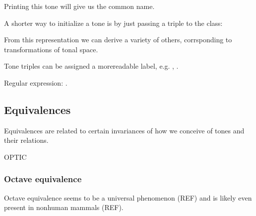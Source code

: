 \documentclass[letterpaper,10pt,english]{sphinxmanual}
\begin{document}
\begin{sphinxVerbatim}[commandchars=\\\{\}]
   

    
\end{sphinxVerbatim}

Printing this tone will give us the common name.

\begin{sphinxVerbatim}[commandchars=\\\{\}]
 
\end{sphinxVerbatim}

A shorter way to initialize a tone is by just passing a triple to the class:

\begin{sphinxVerbatim}[commandchars=\\\{\}]
  
 
\end{sphinxVerbatim}

From this representation we can derive a variety of others, corrsponding to transformations of
tonal space.

Tone triples can be assigned a more\sphinxhyphen{}readable label, e.g. , .

Regular expression: .


\subsection{Equivalences}
\label{\detokenize{2_fundamentals1:equivalences}}
Equivalences are related to certain invariances of how we conceive of tones and their relations.

OPTIC


\subsubsection{Octave equivalence}
\label{\detokenize{2_fundamentals1:octave-equivalence}}
Octave equivalence seems to be a universal phenomenon (REF) and is likely even present in
non\sphinxhyphen{}human mammals (REF).
\end{document}
